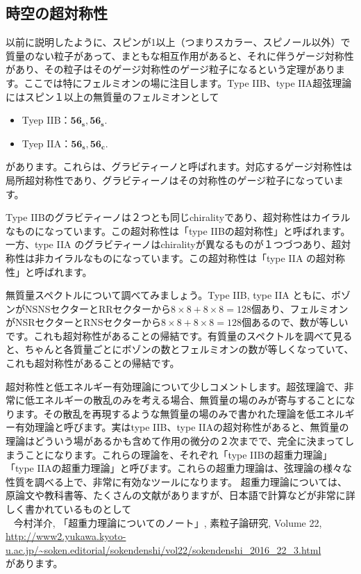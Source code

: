 \documentclass[report,paper=a4, fontsize=12pt, line_length=16cm, number_of_lines=33,dvipdfmx]{jlreq}
\newenvironment{mycite}{\\ \qquad \textbullet\ }{\\}
\numberwithin{equation}{chapter}
\numberwithin{equation}{section}
\newcommand{\fsxs}{\mathbf{56_s}}
\newcommand{\fsxc}{\mathbf{56_c}}
\begin{document}
\subsection{時空の超対称性}
以前に説明したように、スピンが1以上（つまりスカラー、スピノール以外）で質量のない粒子があって、まともな相互作用があると、それに伴うゲージ対称性があり、その粒子はそのゲージ対称性のゲージ粒子になるという定理があります。ここでは特にフェルミオンの場に注目します。Type IIB、type IIA超弦理論にはスピン１以上の無質量のフェルミオンとして
\begin{itemize}
  \item Tyep IIB：$\fsxs,\fsxs$.
  \item Tyep IIA：$\fsxs,\fsxc$.
\end{itemize}
があります。これらは、グラビティーノと呼ばれます。対応するゲージ対称性は局所超対称性であり、グラビティーノはその対称性のゲージ粒子になっています。

Type IIBのグラビティーノは２つとも同じchiralityであり、超対称性はカイラルなものになっています。この超対称性は「type IIBの超対称性」と呼ばれます。一方、type IIA のグラビティーノはchiralityが異なるものが１つづつあり、超対称性は非カイラルなものになっています。この超対称性は「type IIA の超対称性」と呼ばれます。

無質量スペクトルについて調べてみましょう。Type IIB, type IIA ともに、ボゾンがNSNSセクターとRRセクターから$8\times 8+8\times 8=128$個あり、フェルミオンがNSRセクターとRNSセクターから$8\times 8+8\times 8=128$個あるので、数が等しいです。これも超対称性があることの帰結です。有質量のスペクトルを調べて見ると、ちゃんと各質量ごとにボゾンの数とフェルミオンの数が等しくなっていて、これも超対称性があることの帰結です。

超対称性と低エネルギー有効理論について少しコメントします。超弦理論で、非常に低エネルギーの散乱のみを考える場合、無質量の場のみが寄与することになります。その散乱を再現するような無質量の場のみで書かれた理論を低エネルギー有効理論と呼びます。実はtype IIB、type IIAの超対称性があると、無質量の理論はどういう場があるかも含めて作用の微分の２次までで、完全に決まってしまうことになります。これらの理論を、それぞれ「type IIBの超重力理論」「type IIAの超重力理論」と呼びます。これらの超重力理論は、弦理論の様々な性質を調べる上で、非常に有効なツールになります。
超重力理論については、原論文や教科書等、たくさんの文献がありますが、日本語で計算などが非常に詳しく書かれているものとして
\begin{mycite}
  今村洋介, 「超重力理論についてのノート」, 素粒子論研究, Volume 22, \url{http://www2.yukawa.kyoto-u.ac.jp/~soken.editorial/sokendenshi/vol22/sokendenshi_2016_22_3.html}
\end{mycite}
があります。
\end{document}
